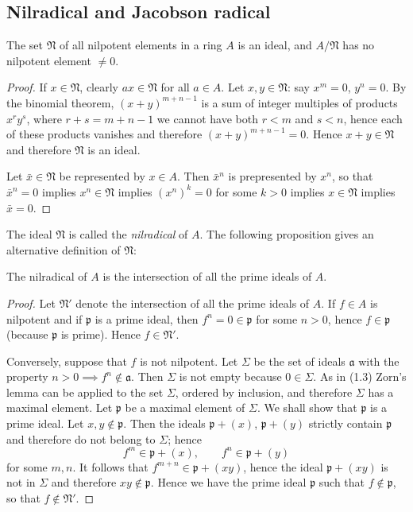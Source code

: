 \subsection{Nilradical and Jacobson radical}
\begin{proposition}
The set $\mathfrak{N}$ of all nilpotent elements in a ring $A$ is
an ideal, and $A/\mathfrak{N}$ has no nilpotent element $\neq 0$.
\end{proposition}
\begin{proof}
If $x\in\mathfrak{N}$, clearly $ax\in\mathfrak{N}$ for all $a\in
A$. Let $x,y\in\mathfrak{N}$: say $x^m=0$, $y^n=0$. By the
binomial theorem, $(x+y)^{m+n-1}$ is a sum of integer multiples
of products $x^ry^s$, where $r+s=m+n-1$ we cannot have both $r<m$
and $s<n$, hence each of these products vanishes and therefore
$(x+y)^{m+n-1}=0$. Hence $x+y\in\mathfrak{N}$ and therefore
$\mathfrak{N}$ is an ideal.

Let $\bar x\in\mathfrak{N}$ be represented by $x\in A$. Then
$\bar x^n$ is prepresented by $x^n$, so that $\bar x^n=0$ implies
$x^n\in\mathfrak{N}$ implies $(x^n)^k=0$ for some $k>0$ implies
$x\in\mathfrak{N}$ implies $\bar x=0$.
\end{proof}
The ideal $\mathfrak{N}$ is called the \emph{nilradical} of
$A$. The following proposition gives an alternative definition of
$\mathfrak{N}$:
\begin{proposition}
The nilradical of $A$ is the intersection of all the prime ideals
of $A$.
\end{proposition}
\begin{proof}
Let $\mathfrak{N}'$ denote the intersection of all the prime
ideals of $A$. If $f\in A$ is nilpotent and if $\mathfrak{p}$ is
a prime ideal, then $f^n=0\in\mathfrak{p}$ for some $n>0$, hence
$f\in\mathfrak{p}$ (because $\mathfrak{p}$ is prime). Hence
$f\in\mathfrak{N}'$.

Conversely, suppose that $f$ is not nilpotent. Let $\Sigma$ be
the set of ideals $\mathfrak{a}$ with the property $n>0\implies
f^n\notin\mathfrak{a}$. Then $\Sigma$ is not empty because
$0\in\Sigma$. As in (1.3) Zorn's lemma can be applied to the set
$\Sigma$, ordered by inclusion, and therefore $\Sigma$ has a
maximal element. Let $\mathfrak{p}$ be a maximal element of
$\Sigma$. We shall show that $\mathfrak{p}$ is a prime ideal. Let
$x,y\notin\mathfrak{p}$. Then the ideals $\mathfrak{p}+(x)$,
$\mathfrak{p}+(y)$ strictly contain $\mathfrak{p}$ and therefore
do not belong to $\Sigma$; hence
\[
f^m\in\mathfrak{p}+(x),\qquad f^n\in\mathfrak{p}+(y)
\]
for some $m,n$. It follows that $f^{m+n}\in\mathfrak{p}+(xy)$,
hence the ideal $\mathfrak{p}+(xy)$ is not in $\Sigma$ and
therefore $xy\notin\mathfrak{p}$. Hence we have the  prime  ideal
$\mathfrak{p}$ such that $f\notin\mathfrak{p}$, so that
$f\notin\mathfrak{N}'$.
\end{proof}
